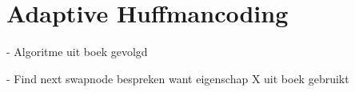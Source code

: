 \section{Adaptive Huffmancoding}

- Algoritme uit boek gevolgd

- Find next swapnode bespreken want eigenschap X uit boek gebruikt

